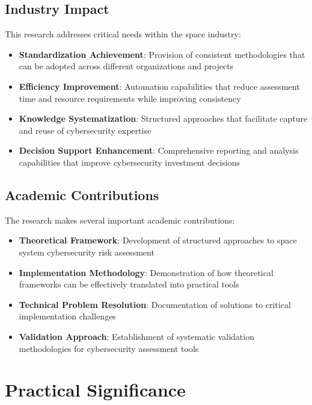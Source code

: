 \documentclass[binding=0.6cm]{sapthesis}
\begin{document}
\subsection{Industry Impact}

This research addresses critical needs within the space industry:

\begin{itemize}
    \item \textbf{Standardization Achievement}: Provision of consistent methodologies that can be adopted across different organizations and projects
    \item \textbf{Efficiency Improvement}: Automation capabilities that reduce assessment time and resource requirements while improving consistency
    \item \textbf{Knowledge Systematization}: Structured approaches that facilitate capture and reuse of cybersecurity expertise
    \item \textbf{Decision Support Enhancement}: Comprehensive reporting and analysis capabilities that improve cybersecurity investment decisions
\end{itemize}

\subsection{Academic Contributions}

The research makes several important academic contributions:

\begin{itemize}
    \item \textbf{Theoretical Framework}: Development of structured approaches to space system cybersecurity risk assessment
    \item \textbf{Implementation Methodology}: Demonstration of how theoretical frameworks can be effectively translated into practical tools
    \item \textbf{Technical Problem Resolution}: Documentation of solutions to critical implementation challenges
    \item \textbf{Validation Approach}: Establishment of systematic validation methodologies for cybersecurity assessment tools
\end{itemize}

\section{Practical Significance}
\end{document}

